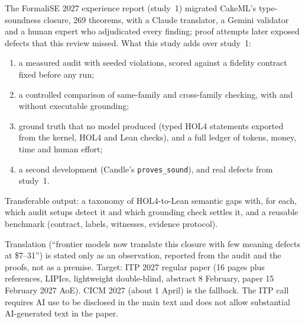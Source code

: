 \documentclass[11pt,a4paper]{article}
\newcommand{\code}[1]{\texttt{#1}}
\begin{document}
The FormaliSE 2027 experience report (study~1) migrated CakeML's type-soundness closure, 269 theorems, with a Claude translator, a Gemini validator and a human expert who adjudicated every finding; proof attempts later exposed defects that this review missed. What this study adds over study~1:
\begin{enumerate}
\item a measured audit with seeded violations, scored against a fidelity contract fixed before any run;
\item a controlled comparison of same-family and cross-family checking, with and without executable grounding;
\item ground truth that no model produced (typed HOL4 statements exported from the kernel, HOL4 and Lean checks), and a full ledger of tokens, money, time and human effort;
\item a second development (Candle's \code{proves\_sound}), and real defects from study~1.
\end{enumerate}
Transferable output: a taxonomy of HOL4-to-Lean semantic gaps with, for each, which audit setups detect it and which grounding check settles it, and a reusable benchmark (contract, labels, witnesses, evidence protocol).

Translation (``frontier models now translate this closure with few meaning defects at \$7--31'') is stated only as an observation, reported from the audit and the proofs, not as a premise. Target: ITP 2027 regular paper (16 pages plus references, LIPIcs, lightweight double-blind, abstract 8 February, paper 15 February 2027 AoE). CICM 2027 (about 1 April) is the fallback. The ITP call requires AI use to be disclosed in the main text and does not allow substantial AI-generated text in the paper.
\end{document}

